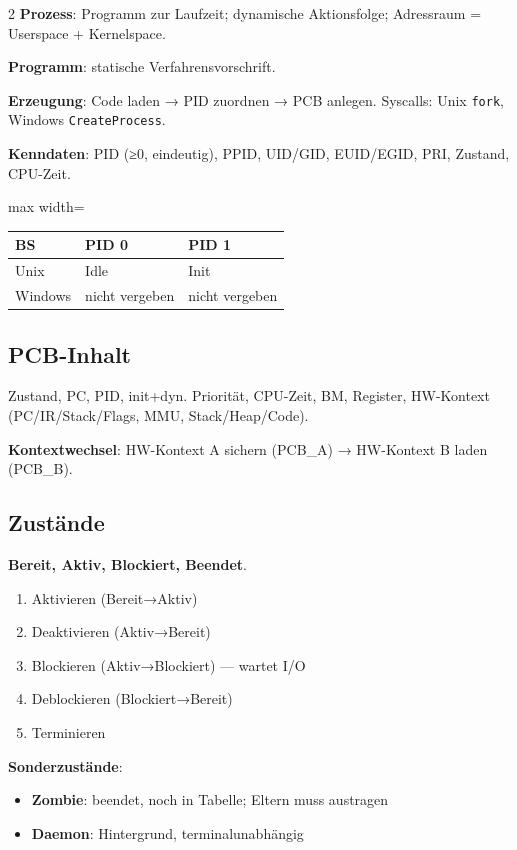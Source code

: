 \documentclass[10pt, a4paper]{article}
\begin{document}
\begin{multicols}{2}
\textbf{Prozess}: Programm zur Laufzeit; dynamische Aktionsfolge; Adressraum = Userspace + Kernelspace.


\textbf{Programm}: statische Verfahrensvorschrift.


\textbf{Erzeugung}: Code laden → PID zuordnen → PCB anlegen. Syscalls: Unix \texttt{fork}, Windows \texttt{CreateProcess}.


\textbf{Kenndaten}: PID (≥0, eindeutig), PPID, UID/GID, EUID/EGID, PRI, Zustand, CPU-Zeit.



{\small
\begin{adjustbox}{max width=\linewidth}
{\scriptsize
\begin{tabular}{lll}
\toprule
\textbf{BS} & \textbf{PID 0} & \textbf{PID 1} \\
\midrule
Unix & Idle & Init \\
Windows & nicht vergeben & nicht vergeben \\
\bottomrule
\end{tabular}
}
\end{adjustbox}
}



\subsection{PCB-Inhalt}
Zustand, PC, PID, init+dyn. Priorität, CPU-Zeit, BM, Register, HW-Kontext (PC/IR/Stack/Flags, MMU, Stack/Heap/Code).


\textbf{Kontextwechsel}: HW-Kontext A sichern (PCB\_A) → HW-Kontext B laden (PCB\_B).



\subsection{Zustände}
\textbf{Bereit, Aktiv, Blockiert, Beendet}.

\begin{enumerate}
  \item Aktivieren (Bereit→Aktiv)
  \item Deaktivieren (Aktiv→Bereit)
  \item Blockieren (Aktiv→Blockiert) — wartet I/O
  \item Deblockieren (Blockiert→Bereit)
  \item Terminieren
\end{enumerate}

\textbf{Sonderzustände}:

\begin{itemize}
  \item \textbf{Zombie}: beendet, noch in Tabelle; Eltern muss austragen
  \item \textbf{Daemon}: Hintergrund, terminalunabhängig
\end{itemize}



\end{multicols}
\end{document}
